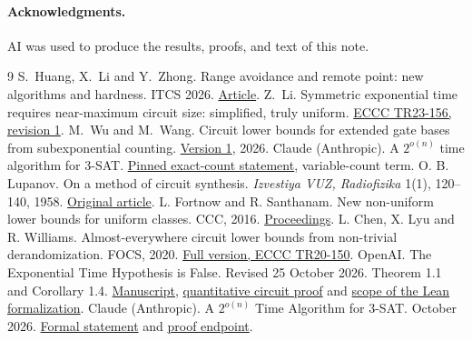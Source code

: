 \documentclass[12pt,letterpaper]{article}
\begin{document}
\paragraph{Acknowledgments.}
AI was used to produce the results, proofs, and text of this note.

\begin{thebibliography}{9}\small
{} S.~Huang, X.~Li and Y.~Zhong. Range avoidance and remote point:
new algorithms and hardness. ITCS 2026.
\href{https://doi.org/10.4230/LIPIcs.ITCS.2026.79}{Article}.
 Z.~Li. Symmetric exponential time requires near-maximum
circuit size: simplified, truly uniform.
\href{https://eccc.weizmann.ac.il/report/2023/156/}{ECCC TR23-156, revision 1}.
 M.~Wu and M.~Wang. Circuit lower bounds for extended
gate bases from subexponential counting.
\href{https://arxiv.org/abs/2611.02560v1}{Version 1}, 2026.
 Claude (Anthropic). A $2^{o(n)}$ time algorithm
for 3-SAT. \href{https://github.com/anthropics/formal-math/blob/11b6c7e3c927df2658f513b6b68ea7f8929c62c5/eth/MainResults.lean}{Pinned exact-count statement}, variable-count term.
 O. B. Lupanov. On a method of circuit synthesis.
\emph{Izvestiya VUZ, Radiofizika} 1(1), 120--140, 1958.
\href{https://radiophysics.unn.ru/issues/1958/1/120}{Original article}.
 L. Fortnow and R. Santhanam.
New non-uniform lower bounds for uniform classes. CCC, 2016.
\href{https://doi.org/10.4230/LIPIcs.CCC.2016.19}{Proceedings}.
 L. Chen, X. Lyu and R. Williams.
Almost-everywhere circuit lower bounds from non-trivial derandomization.
FOCS, 2020. \href{https://eccc.weizmann.ac.il/report/2020/150/}{Full version, ECCC TR20-150}.
 OpenAI. The Exponential Time Hypothesis is False.
Revised 25 October 2026. Theorem 1.1 and Corollary 1.4.
\href{https://github.com/openai/math/tree/main/preprints/The-Exponential-Time-Hypothesis-is-False-October-25-2026}{Manuscript},
\href{https://raw.githubusercontent.com/openai/math/7ef5c0cc5ca4b0e072b7a050fca09ab24bc6fa3a/preprints/The-Exponential-Time-Hypothesis-is-False-October-25-2026/build/quantitative-circuits.tex}{quantitative circuit proof}
and \href{https://github.com/openai/math/blob/main/lean/docs/378.md}{scope of the Lean formalization}.
 Claude (Anthropic). A \(2^{o(n)}\) Time Algorithm for 3-SAT.
October 2026. \href{https://github.com/anthropics/formal-math/blob/16a5ce41304fcdaea4e0be7c132e1c361dc26da5/eth/MainResults.lean}{Formal statement}
and \href{https://github.com/anthropics/formal-math/blob/16a5ce41304fcdaea4e0be7c132e1c361dc26da5/eth/Solution.lean}{proof endpoint}.
\end{thebibliography}
\end{document}
